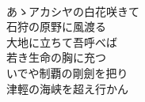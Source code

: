 \documentclass[10pt,b5j]{tarticle} %
\begin{document}
\begin{enumerate}
\begin{minipage}[c]{\blocksize}
    \end{minipage}
    \begin{minipage}[c]{\blocksize}
        
        \vspace{\linespace}
        \item~\\
        あゝアカシヤの白花咲きて\\
        石狩の原野に風渡る\\
        大地に立ちて吾呼べば\\
        若き生命の胸に充つ\\
        いでや制覇の剛劍を把り\\
        津輕の海峡を超え行かん
    
    \end{minipage}
\end{enumerate} %
\end{document}
